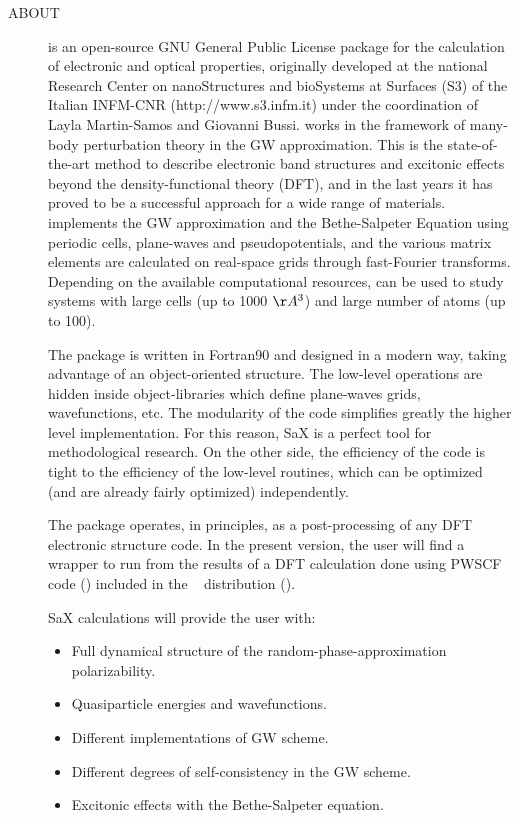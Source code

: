 \documentclass[11pt]{article}
\begin{document}
\newpage
\begin{description}

\item[ABOUT] \SAX is an open-source GNU General Public License package for the calculation of
electronic and optical properties, originally developed at the national Research Center on nanoStructures and bioSystems at Surfaces (S3)
of the Italian INFM-CNR (http://www.s3.infm.it) under the coordination
of Layla Martin-Samos and Giovanni Bussi. \SAX works in the framework of many-body perturbation theory
in the GW approximation. This is the state-of-the-art method to describe
electronic band structures and excitonic effects beyond the
density-functional theory (DFT), and in the last years
it has proved to be a successful approach for a wide range of materials.
\SAX implements the GW approximation and the Bethe-Salpeter Equation using periodic cells, plane-waves and
pseudopotentials, and the various matrix elements are calculated on
real-space grids through fast-Fourier transforms. Depending on the
available computational resources, \SAX can be used to study
systems with large cells (up to 1000 $\AA^3$) and large number of atoms
(up to 100).

The \SAX package is written in Fortran90 and designed in a modern way,
taking advantage of an object-oriented structure.
The low-level operations are hidden inside object-libraries
which define plane-waves grids, wavefunctions, etc.
The modularity of the code simplifies greatly the higher level implementation. 
For this reason, SaX is a perfect tool
for methodological research. On the other side, the efficiency
of the code is tight to the efficiency of the low-level
routines, which can be optimized (and are already fairly optimized)
independently.

The \SAX package operates, in principles, as a post-processing of
any DFT electronic structure code. In the present version, the user will
find a wrapper to run \SAX from the results of a DFT calculation
done using PWSCF code (\PWSCFURL) included in the \ESPRESSO~ distribution (\ESPRESSOURL).

SaX calculations will provide the user with:
\begin{itemize}
\item Full dynamical structure of the random-phase-approximation polarizability.
\item Quasiparticle energies and wavefunctions.
\item Different implementations of GW scheme.
\item Different degrees of self-consistency in the GW scheme.
\item Excitonic effects with the Bethe-Salpeter equation.
\end{itemize}


\end{description}
\end{document}
